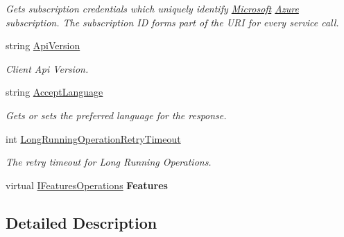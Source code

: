 \begin{DoxyCompactItemize}
\begin{DoxyCompactList}\small\item\em Gets subscription credentials which uniquely identify \hyperlink{namespace_microsoft}{Microsoft} \hyperlink{namespace_microsoft_1_1_azure}{Azure} subscription. The subscription ID forms part of the U\+RI for every service call. \end{DoxyCompactList}\item 
string \hyperlink{class_microsoft_1_1_azure_1_1_management_1_1_resources_1_1_feature_client_ab9ec640be2a72809c8d0fbf59f9601e9}{Api\+Version}
\begin{DoxyCompactList}\small\item\em Client Api Version. \end{DoxyCompactList}\item 
string \hyperlink{class_microsoft_1_1_azure_1_1_management_1_1_resources_1_1_feature_client_a12c737e4db1139025734fddc6e609dbd}{Accept\+Language}
\begin{DoxyCompactList}\small\item\em Gets or sets the preferred language for the response. \end{DoxyCompactList}\item 
int \hyperlink{class_microsoft_1_1_azure_1_1_management_1_1_resources_1_1_feature_client_ad5ff8d180c179578f08ed658d4134d56}{Long\+Running\+Operation\+Retry\+Timeout}
\begin{DoxyCompactList}\small\item\em The retry timeout for Long Running Operations. \end{DoxyCompactList}\item 
virtual \hyperlink{interface_microsoft_1_1_azure_1_1_management_1_1_resources_1_1_i_features_operations}{I\+Features\+Operations} {\bfseries Features}\hypertarget{class_microsoft_1_1_azure_1_1_management_1_1_resources_1_1_feature_client_a0ab16e5e5a7bdd0cd0ab0b16999d26e0}{}\label{class_microsoft_1_1_azure_1_1_management_1_1_resources_1_1_feature_client_a0ab16e5e5a7bdd0cd0ab0b16999d26e0}

\end{DoxyCompactItemize}


\subsection{Detailed Description}





